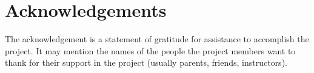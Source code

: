 \chapter*{Acknowledgements}

The acknowledgement is a statement of gratitude for assistance to accomplish the project. It may mention the names of the people the project members want to thank for their support in the project (usually parents, friends, instructors).
